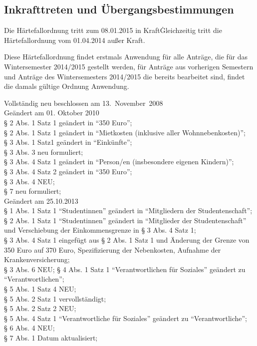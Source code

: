 \begin{multicols}{2}
\section{Inkrafttreten und Übergangsbestimmungen}

\Abs \Satz Die Härtefallordnung tritt zum 08.01.2015 in Kraft\. Gleichzeitig tritt die Härtefallordnung  vom 01.04.2014 außer Kraft.

\Abs \Satz Diese Härtefallordnung findet erstmals Anwendung für alle Anträge, die für das Wintersemester 2014/2015 gestellt werden, für Anträge aus vorherigen Semestern und Anträge des Wintersemesters 2014/2015 die bereits bearbeitet sind, findet die damals gültige Ordnung Anwendung.

\end{multicols}

\nopagebreak
\vspace{1cm}



\footnotesize

Vollständig neu beschlossen am 13.~November~2008\\

Geändert am 01. Oktober 2010 \\
§ 2 Abs. 1 Satz 1 geändert in "`350 Euro"'; \\
§ 2 Abs. 1 Satz 1 geändert in "`Mietkosten (inklusive aller Wohnnebenkosten)"'; \\
§ 3 Abs. 1 Satz1 geändert in "`Einkünfte"'; \\
§ 3 Abs. 3 neu formuliert; \\
§ 3 Abs. 4 Satz 1 geändert in "`Person/en (insbesondere eigenen Kindern)"'; \\
§ 3 Abs. 4 Satz 2 geändert in "`350 Euro"'; \\
§ 3 Abs. 4 NEU; \\
§ 7 neu formuliert; \\

Geändert am 25.10.2013 \\
§ 1 Abs. 1 Satz 1 "`Studentinnen"' geändert in "`Mitgliedern der Studentenschaft"'; \\
§ 2 Abs. 1 Satz 1 "`Studentinnen"' geändert in "`Mitglieder der Studentenschaft"' und Verschiebung der Einkommensgrenze in § 3 Abs. 4 Satz 1; \\
§ 3 Abs. 4 Satz 1 eingefügt aus § 2 Abs. 1 Satz 1 und Änderung der Grenze von 350 Euro auf 370 Euro, Spezifizierung der Nebenkosten, Aufnahme der Krankenversicherung; \\
§ 3 Abs. 6 NEU;
§ 4 Abs. 1 Satz 1 "`Verantwortlichen für Soziales"' geändert zu "`Verantwortlichen"';\\
§ 5 Abs. 1 Satz 4 NEU;\\
§ 5 Abs. 2 Satz 1 vervollständigt;\\
§ 5 Abs. 2 Satz 2 NEU;\\
§ 5 Abs. 4 Satz 1 "`Verantwortliche für Soziales"' geändert zu "`Verantwortliche"';\\
§ 6 Abs. 4 NEU;\\
§ 7 Abs. 1 Datum aktualisiert;\\

